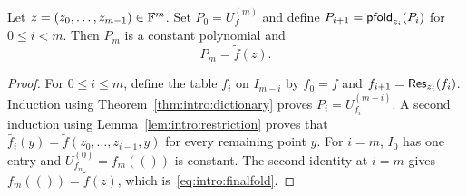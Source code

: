 \begin{corollary}\label{cor:intro:iterated}
Let $z=(z_0,\ldots,z_{m-1})\in\mathbb{F}^m$. Set $P_0=U_f^{(m)}$ and define $P_{i+1}=\mathsf{pfold}_{z_i}(P_i)$ for $0\leq i<m$. Then $P_m$ is a constant polynomial and
\begin{equation}\label{eq:intro:finalfold}
 P_m=\widetilde f(z).
\end{equation}
\end{corollary}
\begin{proof}
For $0\leq i\leq m$, define the table $f_i$ on $I_{m-i}$ by $f_0=f$ and $f_{i+1}=\mathsf{Res}_{z_i}(f_i)$. Induction using Theorem~\ref{thm:intro:dictionary} proves $P_i=U_{f_i}^{(m-i)}$. A second induction using Lemma~\ref{lem:intro:restriction} proves that $\widetilde{f_i}(y)=\widetilde f(z_0,\ldots,z_{i-1},y)$ for every remaining point $y$. For $i=m$, $I_0$ has one entry and $U_{f_m}^{(0)}=f_m(())$ is constant. The second identity at $i=m$ gives $f_m(())=\widetilde f(z)$, which is~\eqref{eq:intro:finalfold}.
\end{proof}
